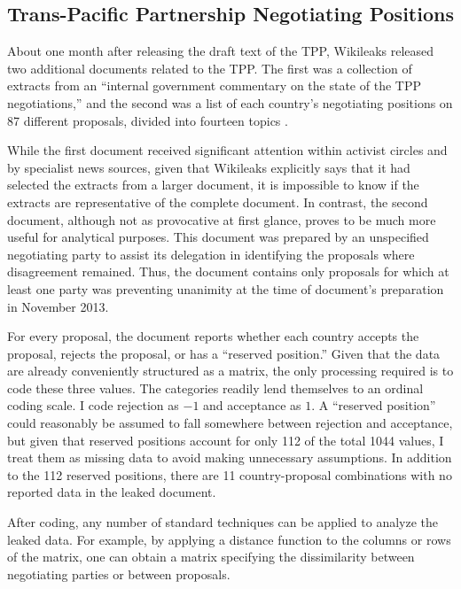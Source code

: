 \documentclass[12pt]{article}
\begin{document}
\subsection{Trans-Pacific Partnership Negotiating Positions}
\label{tpp_np}

About one month after releasing the draft text of the TPP, Wikileaks released two 
additional documents related to the TPP. The first was a collection of extracts from an ``internal 
government commentary on the state of the TPP negotiations,'' and the second was a list of each 
country's negotiating positions on 87 different proposals, divided into fourteen topics \citep{wikileaks2013second}.

While the first document received significant 
attention within activist circles and by specialist news sources, given that Wikileaks 
explicitly says that it had selected the extracts from a larger document, it is impossible to know if the  
extracts are representative of the complete document. In contrast, the second document, although 
not as provocative at first glance, proves to be much more useful for 
analytical purposes. This document was prepared by an unspecified 
negotiating party to assist its delegation in identifying the proposals where disagreement remained. 
Thus, the document contains only proposals for which at least one party was preventing unanimity at 
the time of document's preparation in November 2013.

For every proposal, the document reports whether each country accepts the proposal, rejects the 
proposal, 
or has a ``reserved position.''	Given that the data are already conveniently structured as a matrix, 
the only processing required is to code these three values. The categories 
readily lend themselves to an ordinal coding scale. I code rejection as $-1$ and acceptance as 
$1$. A ``reserved position'' could reasonably be assumed to fall somewhere between rejection and acceptance, 
but given that reserved positions account for only 112 of the total 1044 values, I treat them as 
missing data to avoid making unnecessary assumptions. In addition to the 112 reserved positions, 
there are 11 country-proposal combinations with no reported data in the leaked document.

After coding, any number of standard techniques can be applied 
to analyze the leaked data. For example, by applying a distance function to the columns or rows of 
the matrix, one can obtain a matrix specifying the dissimilarity between negotiating 
parties or between proposals. 
\end{document}
